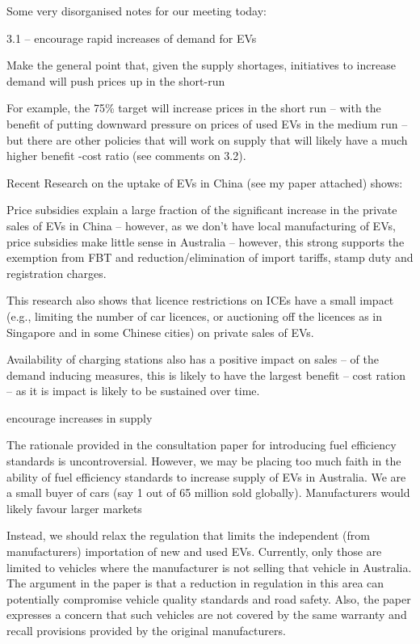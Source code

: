 Some very disorganised notes for our meeting today:

 

3.1 – encourage rapid increases of demand for EVs

 

    Make the general point that, given the supply shortages, initiatives to
    increase demand will push prices up in the short-run

        For example, the 75\% target will increase prices in the short run –
        with the benefit of putting downward pressure on prices of used EVs in
        the medium run – but there are other policies that will work on supply
        that will likely have a much higher benefit -cost ratio (see comments
        on 3.2). 
       
       Recent Research on the uptake of EVs in China (see my paper attached)
       shows:

        Price subsidies explain a large fraction of the significant increase in
        the private sales of EVs in China – however, as we don’t have local
        manufacturing of EVs, price subsidies make little sense in Australia –
        however, this strong supports the exemption from FBT and
        reduction/elimination of  import tariffs, stamp duty and registration
        charges.

        This research also shows that licence restrictions on ICEs have a small
        impact (e.g., limiting the number of car licences, or auctioning off
        the licences as in Singapore and in some Chinese cities) on private
        sales of EVs.

        Availability of charging stations also has a positive impact on sales –
        of the demand inducing measures, this is likely to have the largest
        benefit – cost ration – as it is impact is likely to be sustained over
        time.

 

        encourage increases in supply

    The rationale provided in the consultation paper for introducing fuel
    efficiency standards is uncontroversial. However, we may be placing too
    much faith in the ability of fuel efficiency standards to increase supply
    of EVs in Australia. We are a small buyer of cars (say 1 out of 65 million
    sold globally). Manufacturers would likely favour larger markets

    Instead, we should relax the regulation that limits the independent (from
    manufacturers) importation of new and used EVs. Currently, only those are
    limited to vehicles where the manufacturer is not selling that vehicle in
    Australia. The argument in the paper is that a reduction in regulation in
    this area can potentially compromise vehicle quality standards and road
    safety. Also, the paper expresses a concern that such vehicles are not
    covered by the same warranty and recall provisions provided by the original
    manufacturers.

